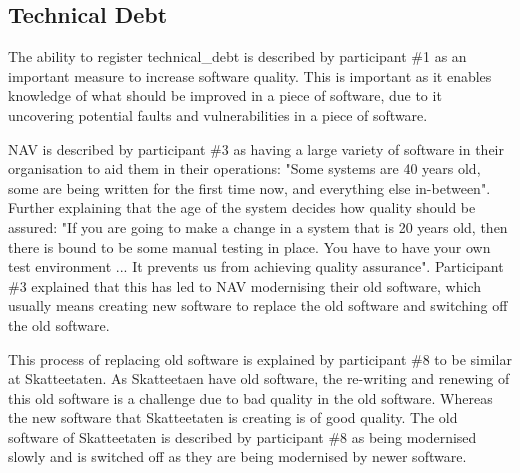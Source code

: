 \subsection{Technical Debt} \label{sec:technical_debt}
The ability to register \gls{technical_debt} is described by participant \#1 as an important measure to increase software quality. This is important as it enables knowledge of what should be improved in a piece of software, due to it uncovering potential faults and vulnerabilities in a piece of software.


NAV is described by participant \#3 as having a large variety of software in their organisation to aid them in their operations: "Some systems are 40 years old, some are being written for the first time now, and everything else in-between". Further explaining that the age of the system decides how quality should be assured: "If you are going to make a change in a system that is 20 years old, then there is bound to be some manual testing in place. You have to have your own test environment ... It prevents us from achieving quality assurance". Participant \#3 explained that this has led to NAV modernising their old software, which usually means creating new software to replace the old software and switching off the old software.


This process of replacing old software is explained by participant \#8 to be similar at Skatteetaten. As Skatteetaen have old software, the re-writing and renewing of this old software is a challenge due to bad quality in the old software. Whereas the new software that Skatteetaten is creating is of good quality. The old software of Skatteetaten is described by participant \#8 as being modernised slowly and is switched off as they are being modernised by newer software.

